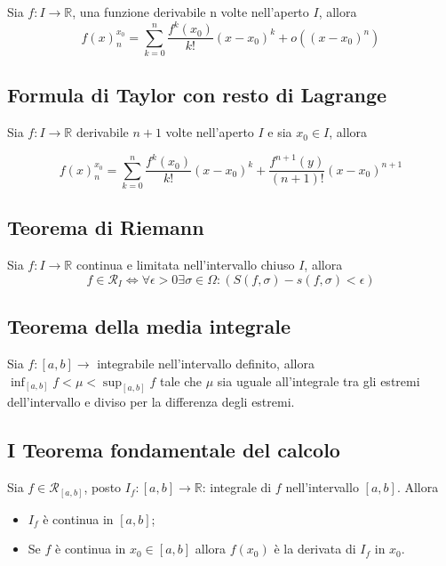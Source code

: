 \documentclass{article}
\begin{document}
Sia $f:I \rightarrow \mathbb{R}$, una funzione derivabile n volte nell'aperto $I$, allora
\begin{equation*}
	f(x)_n^{x_0}= \sum_{k = 0}^n \frac{f^k(x_0)}{k!}(x-x_0)^k+o((x-x_0)^n)
\end{equation*}

\subsection{Formula di Taylor con resto di Lagrange}

Sia $f:I \rightarrow \mathbb{R}$ derivabile $n+1$ volte nell'aperto $I$ e sia $x_0 \in I$, allora

\begin{equation*}
 f(x)^{x_0}_n = \sum_{k = 0}^n \frac{f^k(x_0)}{k!}(x-x_0)^k+\frac{f^{n+1}(y)}{(n+1)!}(x-x_0)^{n+1}
\end{equation*}

\subsection{Teorema di Riemann}

Sia $f:I \rightarrow \mathbb{R}$ continua e limitata nell'intervallo chiuso $I$, allora
\begin{equation*}
	f \in \mathcal{R}_I \iff \forall \epsilon >0 \exists \sigma \in \Omega : (S(f,\sigma)-s(f,\sigma)<\epsilon)
\end{equation*}

\subsection{Teorema della media integrale}

Sia $f:[a,b]\rightarrow$ integrabile nell'intervallo definito, allora $\inf_{[a,b]}f < \mu < \sup_{[a,b]}f$ tale che $\mu$ sia uguale all'integrale tra gli estremi dell'intervallo e diviso per la differenza degli estremi.

\subsection{I Teorema fondamentale del calcolo}

Sia $f \in \mathcal{R}_{[a,b]}$, posto $I_f:[a,b]\rightarrow \mathbb{R}$: integrale di $f$ nell'intervallo $[a,b]$. Allora
\begin{itemize}
	\item $I_f$ è continua in $[a,b]$;

	\item Se $f$ è continua in $x_0\in [a,b]$ allora $f(x_0)$ è la derivata di $I_f$ in $x_0$.
\end{itemize}
\end{document}
